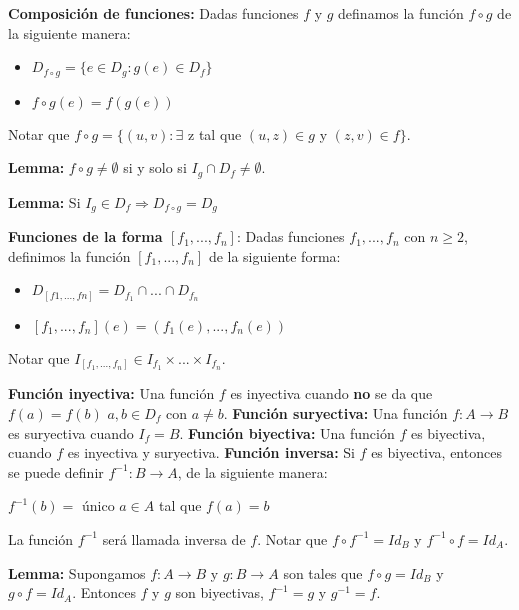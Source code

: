 \documentclass{article}
\begin{document}
\begin{flushleft}
\textbf{Composición de funciones:} Dadas funciones $f$ y $g$ definamos la función $f \circ g$ de la siguiente manera:
\begin{itemize}
\item $D_{f \circ g} = \{ e \in D_g : g(e) \in D_f\}$
\item $f \circ g(e) = f(g(e))$
\end{itemize}

Notar que $f \circ g = \{(u, v): \exists$ z tal que $ (u, z) \in g$ y $(z, v) \in f\}.$\linebreak

\textbf{Lemma:} $f \circ g \neq \emptyset$ si y solo si $I_g \cap D_f \neq \emptyset.$\linebreak

\textbf{Lemma:} Si $I_g \in D_f \Rightarrow D_{f \circ g} = D_g$ \linebreak

\textbf{Funciones de la forma $[f_1,...,f_n]$}: Dadas funciones $f_1, ..., f_n$ con $ n \geq 2$, definimos la función $[f_1, ..., f_n]$ de la siguiente forma:
\begin{itemize}
\item $D_{[f1, ..., fn]} = D_{f_1} \cap ... \cap D_{f_n}$
\item $[f_1, ..., f_n](e) = (f_1(e), ..., f_n(e))$
\end{itemize}
Notar que $I_{[f_1, ..., f_n]} \in I_{f_1} \times ... \times I_{f_n}.$\linebreak

\textbf{Función inyectiva:} Una función $f$ es inyectiva cuando \textbf{no} se da que $f(a) = f(b)$ \forall $a, b \in D_f$ con $a \neq b$.\linebreak
\textbf{Función suryectiva:} Una función $f: A \rightarrow B$ es suryectiva cuando $I_f = B$.\linebreak
\textbf{Función biyectiva:} Una función $f$ es biyectiva, cuando $f$ es inyectiva y suryectiva.\linebreak
\textbf{Función inversa:} Si $f$ es biyectiva, entonces se puede definir $f^{-1}: B \rightarrow A$, de la siguiente manera:
\begin{center}
    $f^{-1}(b) = $ único $a \in A$ tal que $f(a) = b$
\end{center}
La función $f^{-1}$ será llamada inversa de $f$. Notar que $f \circ f^{-1} = Id_B$ y $f^{-1} \circ f = Id_A$.\linebreak

\textbf{Lemma:} Supongamos $f: A \rightarrow B$ y $g: B \rightarrow A$ son tales que $f \circ g = Id_B$ y $g \circ f = Id_A$. Entonces $f$ y $g$ son biyectivas, $f^{-1} = g$ y $g^{-1} = f$.\linebreak


\end{flushleft}
\end{document}
